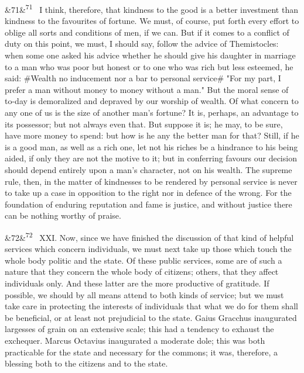 \documentclass[12pt]{article}
\newcommand{\para}[1][]{\par\noindent\ifx&#1&\else\textsuperscript{\footnotesize #1}~\fi}
\begin{document}
\para[71] I think, therefore, that kindness to the good is a better investment than kindness to the favourites of fortune. We must, of course, put forth every effort to oblige all sorts and conditions of men, if we can. But if it comes to a conflict of duty on this point, we must, I should say, follow the advice of Themistocles: when some one asked his advice whether he should give his daughter in marriage to a man who was poor but honest or to one who was rich but less esteemed, he said: \#Wealth no inducement nor a bar to personal service\# "For my part, I prefer a man without money to money without a man." But the moral sense of to-day is demoralized and depraved by our worship of wealth. Of what concern to any one of us is the size of another man's fortune? It is, perhaps, an advantage to its possessor; but not always even that. But suppose it is; he may, to be sure, have more money to spend: but how is he any the better man for that? Still, if he is a good man, as well as a rich one, let not his riches be a hindrance to his being aided, if only they are not the motive to it; but in conferring favours our decision should depend entirely upon a man's character, not on his wealth. The supreme rule, then, in the matter of kindnesses to be rendered by personal service is never to take up a case in opposition to the right nor in defence of the wrong. For the foundation of enduring reputation and fame is justice, and without justice there can be nothing worthy of praise.

\para[72] XXI. Now, since we have finished the discussion of that kind of helpful services which concern individuals, we must next take up those which touch the whole body politic and the state. Of these public services, some are of such a nature that they concern the whole body of citizens; others, that they affect individuals only. And these latter are the more productive of gratitude. If possible, we should by all means attend to both kinds of service; but we must take care in protecting the interests of individuals that what we do for them shall be beneficial, or at least not prejudicial to the state. Gaius Gracchus inaugurated largesses of grain on an extensive scale; this had a tendency to exhaust the exchequer. Marcus Octavius inaugurated a moderate dole; this was both practicable for the state and necessary for the commons; it was, therefore, a blessing both to the citizens and to the state.
\end{document}

